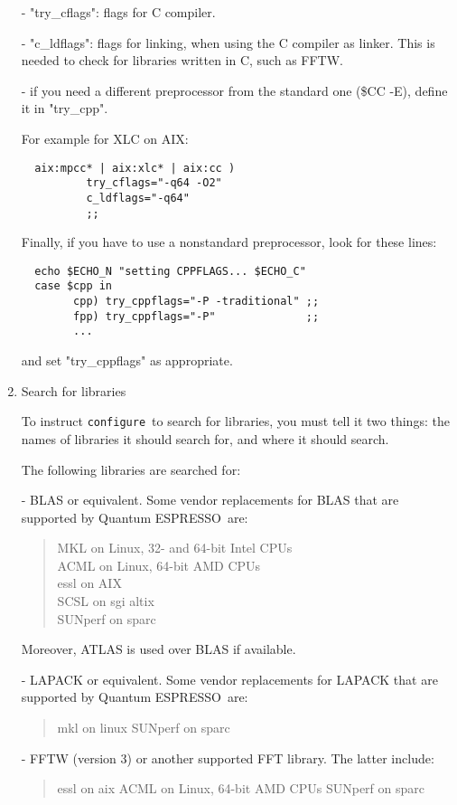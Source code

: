 \documentclass[12pt,a4paper]{article}
\def\qe{{\sc Quantum ESPRESSO}}
\def\configure{\texttt{configure}}
\begin{document}
\begin{enumerate}
- "try\_cflags": flags for C compiler.

- "c\_ldflags": flags for linking, when using the C compiler as linker.
This is needed to check for libraries written in C, such as FFTW.

- if you need a different preprocessor from the standard one (\$CC -E),
define it in "try\_cpp".

For example for XLC on AIX:
\begin{verbatim}
  aix:mpcc* | aix:xlc* | aix:cc )
          try_cflags="-q64 -O2"
          c_ldflags="-q64"
          ;;
\end{verbatim}
Finally, if you have to use a nonstandard preprocessor, look for these
lines:
\begin{verbatim}
  echo $ECHO_N "setting CPPFLAGS... $ECHO_C"
  case $cpp in
        cpp) try_cppflags="-P -traditional" ;;
        fpp) try_cppflags="-P"              ;;
        ...
\end{verbatim}
and set "try\_cppflags" as appropriate.

\item Search for libraries

To instruct \configure\ to search for libraries, you must tell it two
things: the names of libraries it should search for, and where it
should search.

The following libraries are searched for:

- BLAS or equivalent. 
Some vendor replacements for BLAS that are supported by \qe\ are:
\begin{quote}
    MKL on Linux, 32- and 64-bit Intel CPUs\\
    ACML on Linux, 64-bit AMD CPUs\\
    essl on AIX\\
    SCSL on sgi altix\\
    SUNperf on sparc
\end{quote}
Moreover, ATLAS is used over BLAS if available.

- LAPACK or equivalent. Some vendor replacements for LAPACK that are supported by \qe\ are:
\begin{quote}
    mkl on linux
    SUNperf on sparc
\end{quote}

- FFTW (version 3) or another supported FFT library. The latter include:
\begin{quote}
    essl on aix
    ACML on Linux, 64-bit AMD CPUs
    SUNperf on sparc
\end{quote}


\end{enumerate}
\end{document}
